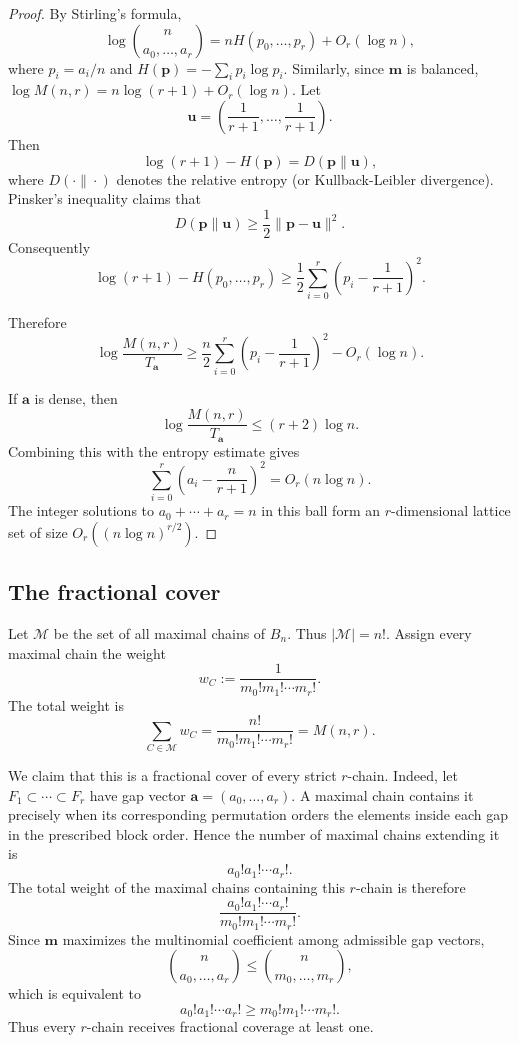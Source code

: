 \documentclass[11pt]{article}
\theoremstyle{definition}
\theoremstyle{remark}
\newcommand{\calM}{\mathcal M}
\newcommand{\balazs}[1]{\textcolor{red}{Balazs: #1}}
\begin{document}
\begin{proof}
By Stirling's formula,
\[
   \log\binom{n}{a_0,
\ldots,a_r}=nH(p_0,
\ldots,p_r)+O_r(\log n),
\]
where $p_i=a_i/n$ and $H(\textbf{p})=-\sum_i p_i\log p_i$. Similarly, since \(\mathbf m\) is balanced,
$\log M(n,r)=n\log(r+1)+O_r(\log n).$
Let
\[
   \textbf{u}=\left(\frac1{r+1},\ldots,\frac1{r+1}\right).
\]
Then
\[
   \log(r+1)-H(\textbf{p})
   =
   D(\textbf{p}\|\textbf{u}),
\]
where \(D(\cdot\|\cdot)\) denotes the relative entropy (or Kullback-Leibler divergence). Pinsker's inequality claims  that \[
   D(\textbf{p}\|\textbf{u})
   \ge \frac12\|\textbf{p}-\textbf{u}\|^2.
\]
Consequently
\[
   \log(r+1)-H(p_0,\ldots,p_r)
   \ge
   \frac12\sum_{i=0}^r
   \left(p_i-\frac1{r+1}\right)^2 .
\]

Therefore
\[
   \log\frac{M(n,r)}{T_{\mathbf a}}
   \ge
   \frac n2\sum_{i=0}^r
   \left(p_i-\frac1{r+1}\right)^2
   -O_r(\log n).
\]

If $\mathbf a$ is dense, then
\[
   \log\frac{M(n,r)}{T_{\mathbf a}}
   \le (r+2)\log n.
\]
Combining this with the entropy estimate gives
\[
   \sum_{i=0}^r\left(a_i-\frac{n}{r+1}\right)^2
   =O_r(n\log n).
\]
The integer solutions to $a_0+\cdots+a_r=n$ in this ball form an $r$-dimensional lattice set of size $O_r((n\log n)^{r/2})$.
\end{proof}


\subsection{The fractional cover}

Let $\calM$ be the set of all maximal chains of $B_n$.  Thus $|\calM|=n!$.  Assign every maximal chain the weight
\[
   w_C:=\frac1{m_0!m_1!\cdots m_r!}.
\]
The total weight is
\[
   \sum_{C\in\calM}w_C
   =\frac{n!}{m_0!m_1!\cdots m_r!}
   =M(n,r).
\]

We claim that this is a fractional cover of every strict $r$-chain.  Indeed, let $F_1\subset\cdots\subset F_r$ have gap vector $\mathbf a=(a_0,\ldots,a_r)$.  A maximal chain contains it precisely when its corresponding permutation orders the elements inside each gap in the prescribed block order.  Hence the number of maximal chains extending it is
\[
   a_0!a_1!\cdots a_r!.
\]
The total weight of the maximal chains containing this $r$-chain is therefore
\[
   \frac{a_0!a_1!\cdots a_r!}{m_0!m_1!\cdots m_r!}.
\]
Since $\mathbf m$ maximizes the multinomial coefficient among admissible gap vectors,
\[
   \binom{n}{a_0,
\ldots,a_r}
   \le
   \binom{n}{m_0,
\ldots,m_r},
\]
which is equivalent to
\[
   a_0!a_1!\cdots a_r!
   \ge
   m_0!m_1!\cdots m_r!.
\]
Thus every $r$-chain receives fractional coverage at least one.
\end{document}
